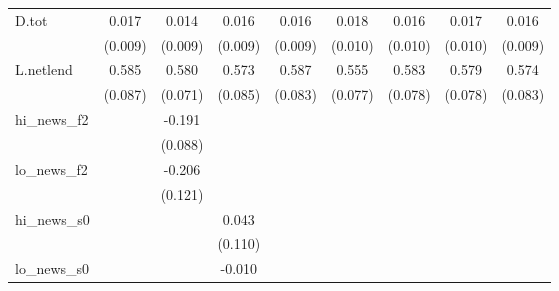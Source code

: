 {\begin{tabular}{l*{8}{c}}
D.tot       &       0.017\sym{*}  &       0.014         &       0.016\sym{*}  &       0.016\sym{*}  &       0.018\sym{*}  &       0.016         &       0.017\sym{*}  &       0.016         \\
            &     (0.009)         &     (0.009)         &     (0.009)         &     (0.009)         &     (0.010)         &     (0.010)         &     (0.010)         &     (0.009)         \\
\addlinespace
L.netlend   &       0.585\sym{***}&       0.580\sym{***}&       0.573\sym{***}&       0.587\sym{***}&       0.555\sym{***}&       0.583\sym{***}&       0.579\sym{***}&       0.574\sym{***}\\
            &     (0.087)         &     (0.071)         &     (0.085)         &     (0.083)         &     (0.077)         &     (0.078)         &     (0.078)         &     (0.083)         \\
\addlinespace
hi\_news\_f2  &                     &      -0.191\sym{**} &                     &                     &                     &                     &                     &                     \\
            &                     &     (0.088)         &                     &                     &                     &                     &                     &                     \\
\addlinespace
lo\_news\_f2  &                     &      -0.206         &                     &                     &                     &                     &                     &                     \\
            &                     &     (0.121)         &                     &                     &                     &                     &                     &                     \\
\addlinespace
hi\_news\_s0  &                     &                     &       0.043         &                     &                     &                     &                     &                     \\
            &                     &                     &     (0.110)         &                     &                     &                     &                     &                     \\
\addlinespace
lo\_news\_s0  &                     &                     &      -0.010         &                     &                     &                     &                     &                     \\

\end{tabular}}
